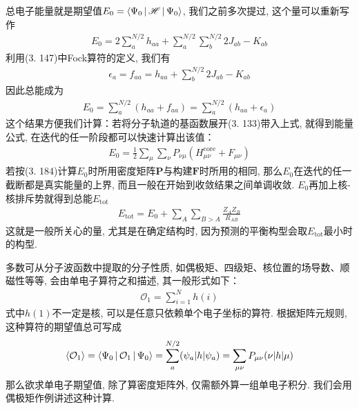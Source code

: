 总电子能量就是期望值$E_0 = \Braket{\Psi_0|\mathscr{H}|\Psi_0}$, 
我们之前多次提过, 
这个量可以重新写作
\begin{align}
	E_0 =2\sum_a^{N/2}h_{aa} + \sum_a^{N/2}\sum_b^{N/2}2J_{ab}-K_{ab}
\end{align}
利用(3.
147)中Fock算符的定义, 
我们有
\begin{align}
	\epsilon_a = f_{aa} = h_{aa} + \sum_b^{N/2}2J_{ab} - K_{ab}
\end{align}
因此总能成为
\begin{align}
	E_0 = \sum_{a}^{N/2}(h_{aa}+f_{aa}) = \sum_{a}^{N/2}(h_{aa}+\epsilon_a)
\end{align}
这个结果方便我们计算：若将分子轨道的基函数展开(3.
133)带入上式, 
就得到能量公式, 
在迭代的任一阶段都可以快速计算出该值：
\begin{align}
	\label{3.184}
	E_0 = \frac{1}{2}\sum_\mu\sum_\nu P_{\nu\mu}(H_{\mu\nu}^\mathrm{core}+F_{\mu\nu})
\end{align}
若按(3.
184)计算$E_0$时所用密度矩阵$\mathbf{P}$与构建$\mathbf{F}$时所用的相同, 
那么$E_0$在迭代的任一截断都是真实能量的上界, 
而且一般在开始到收敛结果之间单调收敛. 
$E_0$再加上核-核排斥势就得到总能$E_\mathrm{tot}$
\begin{align}
	E_\mathrm{tot} = E_0 + \sum_{A}\sum_{B>A}\frac{Z_AZ_B}{R_{AB}}
\end{align}
这就是一般所关心的量, 
尤其是在确定结构时, 
因为预测的平衡构型会取$E_\mathrm{tot}$最小时的构型.


多数可从分子波函数中提取的分子性质, 
如偶极矩、四级矩、核位置的场导数、顺磁性等等, 
会由单电子算符之和描述, 
其一般形式如下：
\begin{align}
	\mathcal{O}_1 = \sum_{i=1}^{N}h(i)
\end{align}
式中$h(1)$不一定是核\ha, 
可以是任意只依赖单个电子坐标的算符. 
根据矩阵元规则, 
这种算符的期望值总可写成
\begin{align}
	\Braket{\mathcal{O}_1} = \Braket{\Psi_0|\mathcal{O}_1|\Psi_0} = \sum_{a}^{N/2}(\psi_a|h|\psi_a) = \sum_{\mu\nu}P_{\mu\nu}(\nu|h|\mu)
\end{align}
那么欲求单电子期望值, 
除了算密度矩阵外, 
仅需额外算一组单电子积分. 
我们会用偶极矩作例讲述这种计算. 


